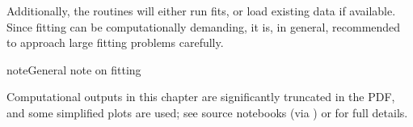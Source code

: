 \documentclass[letterpaper,table,10pt,english]{jupyterBook}
\begin{document}
\sphinxAtStartPar
Additionally, the routines will either run fits, or load existing data if available. Since fitting can be computationally demanding, it is, in general, recommended to approach large fitting problems carefully.

\begin{sphinxShadowBox}
\sphinxstylesidebartitle{}

\begin{sphinxadmonition}{note}{General note on fitting}

\sphinxAtStartPar
Computational outputs in this chapter are significantly truncated in the PDF, and some simplified plots are used; see source notebooks (via ) or  for full details.
\end{sphinxadmonition}
\end{sphinxShadowBox}
\end{document}
